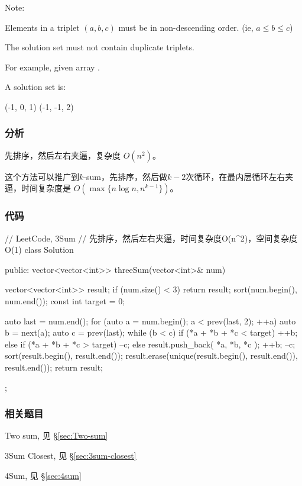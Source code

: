 Note:
\begindot
\item Elements in a triplet $(a,b,c)$ must be in non-descending order. (ie, $a \leq b \leq c$)
\item The solution set must not contain duplicate triplets.
\myenddot

For example, given array .

A solution set is:
\begin{Code}
(-1, 0, 1)
(-1, -1, 2)
\end{Code}


\subsubsection{分析}
先排序，然后左右夹逼，复杂度 $O(n^2)$。

这个方法可以推广到$k$-sum，先排序，然后做$k-2$次循环，在最内层循环左右夹逼，时间复杂度是 $O(\max\{n \log n, n^{k-1}\})$。


\subsubsection{代码}
\begin{Code}
// LeetCode, 3Sum
// 先排序，然后左右夹逼，时间复杂度O(n^2)，空间复杂度O(1)
class Solution {
public:
    vector<vector<int>> threeSum(vector<int>& num) {
        vector<vector<int>> result;
        if (num.size() < 3) return result;
        sort(num.begin(), num.end());
        const int target = 0;

        auto last = num.end();
        for (auto a = num.begin(); a < prev(last, 2); ++a) {
            auto b = next(a);
            auto c = prev(last);
            while (b < c) {
                if (*a + *b + *c < target) {
                    ++b;
                } else if (*a + *b + *c > target) {
                    --c;
                } else {
                    result.push_back({ *a, *b, *c });
                    ++b;
                    --c;
                }
            }
        }
        sort(result.begin(), result.end());
        result.erase(unique(result.begin(), result.end()), result.end());
        return result;
    }
};
\end{Code}


\subsubsection{相关题目}
\begindot
\item Two sum, 见 \S \ref{sec:Two-sum}
\item 3Sum Closest, 见 \S \ref{sec:3sum-closest}
\item 4Sum, 见 \S \ref{sec:4sum}
\myenddot

